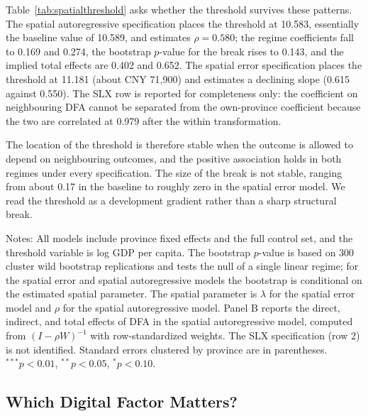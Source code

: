 Table~\ref{tab:spatialthreshold} asks whether the threshold survives these patterns. The spatial autoregressive specification places the threshold at 10.583, essentially the baseline value of 10.589, and estimates $\rho=0.580$; the regime coefficients fall to 0.169 and 0.274, the bootstrap $p$-value for the break rises to 0.143, and the implied total effects are 0.402 and 0.652. The spatial error specification places the threshold at 11.181 (about CNY 71{,}900) and estimates a declining slope (0.615 against 0.550). The SLX row is reported for completeness only: the coefficient on neighbouring DFA cannot be separated from the own-province coefficient because the two are correlated at 0.979 after the within transformation.

The location of the threshold is therefore stable when the outcome is allowed to depend on neighbouring outcomes, and the positive association holds in both regimes under every specification. The size of the break is not stable, ranging from about 0.17 in the baseline to roughly zero in the spatial error model. We read the threshold as a development gradient rather than a sharp structural break.

\begin{table}[H]
\caption{Threshold estimates with spatial controls.}\label{tab:spatialthreshold}
\begin{threeparttable}
\footnotesize

\begin{tablenotes}
\footnotesize
\item Notes: All models include province fixed effects and the full control set, and the threshold variable is log GDP per capita. The bootstrap $p$-value is based on 300 cluster wild bootstrap replications and tests the null of a single linear regime; for the spatial error and spatial autoregressive models the bootstrap is conditional on the estimated spatial parameter. The spatial parameter is $\lambda$ for the spatial error model and $\rho$ for the spatial autoregressive model. Panel B reports the direct, indirect, and total effects of DFA in the spatial autoregressive model, computed from $(I-\rho W)^{-1}$ with row-standardized weights. The SLX specification (row 2) is not identified. Standard errors clustered by province are in parentheses. $^{***}p<0.01$, $^{**}p<0.05$, $^{*}p<0.10$.
\end{tablenotes}
\end{threeparttable}
\end{table}

\subsection{Which Digital Factor Matters?}\label{sec:subdims}

